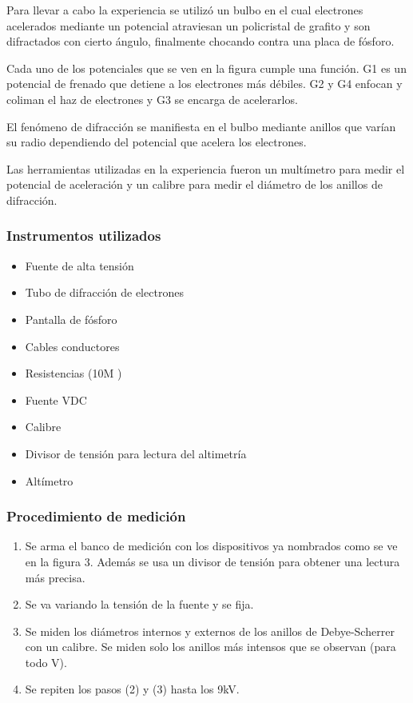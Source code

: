 \documentclass[]{article}
\providecommand{\tightlist}{%
  \setlength{\itemsep}{0pt}\setlength{\parskip}{0pt}}
\begin{document}
Para llevar a cabo la experiencia se utilizó un bulbo en el cual
electrones acelerados mediante un potencial atraviesan un policristal de
grafito y son difractados con cierto ángulo, finalmente chocando contra
una placa de fósforo.

Cada uno de los potenciales que se ven en la figura cumple una función.
G1 es un potencial de frenado que detiene a los electrones más débiles.
G2 y G4 enfocan y coliman el haz de electrones y G3 se encarga de
acelerarlos.

El fenómeno de difracción se manifiesta en el bulbo mediante anillos que
varían su radio dependiendo del potencial que acelera los electrones.

Las herramientas utilizadas en la experiencia fueron un multímetro para
medir el potencial de aceleración y un calibre para medir el diámetro de
los anillos de difracción.

\hypertarget{instrumentos-utilizados}{%
\subsubsection{Instrumentos utilizados}\label{instrumentos-utilizados}}

\begin{itemize}
\tightlist
\item
  Fuente de alta tensión
\item
  Tubo de difracción de electrones
\item
  Pantalla de fósforo
\item
  Cables conductores
\item
  Resistencias (10M )
\item
  Fuente VDC
\item
  Calibre
\item
  Divisor de tensión para lectura del altimetría
\item
  Altímetro
\end{itemize}

\hypertarget{procedimiento-de-mediciuxf3n}{%
\subsubsection{Procedimiento de
medición}\label{procedimiento-de-mediciuxf3n}}

\begin{enumerate}
\def\labelenumi{\arabic{enumi}.}
\tightlist
\item
  Se arma el banco de medición con los dispositivos ya nombrados como se
  ve en la figura 3. Además se usa un divisor de tensión para obtener
  una lectura más precisa.
\item
  Se va variando la tensión de la fuente y se fija.
\item
  Se miden los diámetros internos y externos de los anillos de
  Debye-Scherrer con un calibre. Se miden solo los anillos más intensos
  que se observan (para todo V).
\item
  Se repiten los pasos (2) y (3) hasta los 9kV.
\end{enumerate}
\end{document}
